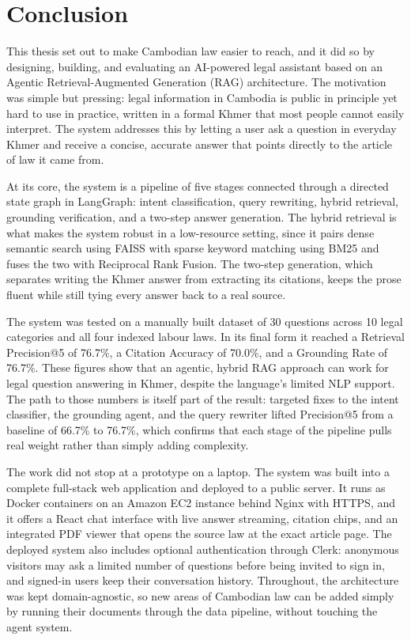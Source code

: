 \newpage
{}

\section{Conclusion}

\hs This thesis set out to make Cambodian law easier to reach, and it did so by designing,
building, and evaluating an AI-powered legal assistant based on an Agentic
Retrieval-Augmented Generation (RAG) architecture. The motivation was simple but pressing:
legal information in Cambodia is public in principle yet hard to use in practice, written
in a formal Khmer that most people cannot easily interpret. The system addresses this by
letting a user ask a question in everyday Khmer and receive a concise, accurate answer that
points directly to the article of law it came from.

\hs At its core, the system is a pipeline of five stages connected through a directed state
graph in LangGraph: intent classification, query rewriting, hybrid retrieval, grounding
verification, and a two-step answer generation. The hybrid retrieval is what makes the
system robust in a low-resource setting, since it pairs dense semantic search using FAISS
with sparse keyword matching using BM25 and fuses the two with Reciprocal Rank Fusion. The
two-step generation, which separates writing the Khmer answer from extracting its
citations, keeps the prose fluent while still tying every answer back to a real source.

\hs The system was tested on a manually built dataset of 30 questions across 10 legal
categories and all four indexed labour laws. In its final form it reached a Retrieval
Precision@5 of 76.7\%, a Citation Accuracy of 70.0\%, and a Grounding Rate of 76.7\%.
These figures show that an agentic, hybrid RAG approach can work for legal question
answering in Khmer, despite the language's limited NLP support. The path to those numbers
is itself part of the result: targeted fixes to the intent classifier, the grounding
agent, and the query rewriter lifted Precision@5 from a baseline of 66.7\% to 76.7\%,
which confirms that each stage of the pipeline pulls real weight rather than simply adding
complexity.

\hs The work did not stop at a prototype on a laptop. The system was built into a complete
full-stack web application and deployed to a public server. It runs as Docker containers on
an Amazon EC2 instance behind Nginx with HTTPS, and it offers a React chat interface with
live answer streaming, citation chips, and an integrated PDF viewer that opens the source
law at the exact article page. The deployed system also includes optional authentication
through Clerk: anonymous visitors may ask a limited number of questions before being
invited to sign in, and signed-in users keep their conversation history. Throughout, the
architecture was kept domain-agnostic, so new areas of Cambodian law can be added simply by
running their documents through the data pipeline, without touching the agent system.

